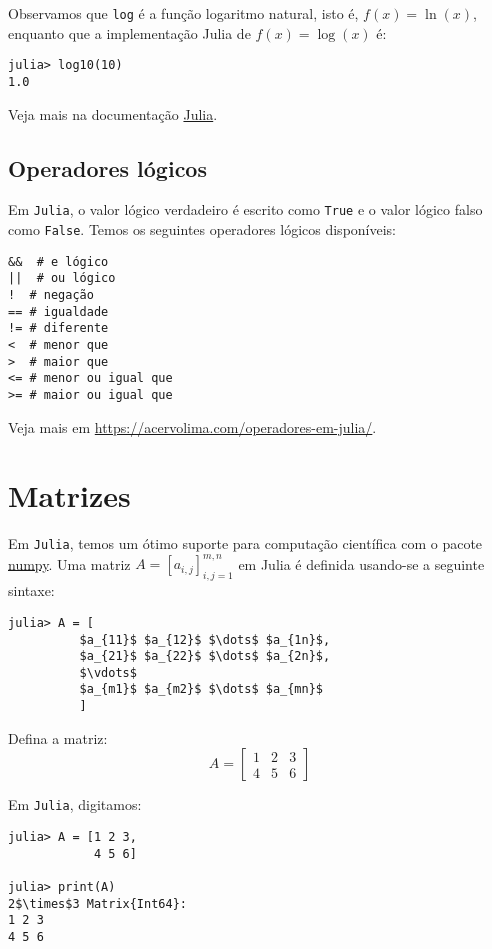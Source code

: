 Observamos que \verb+log+ é a função logaritmo natural, isto é, $f(x) = \ln(x)$, enquanto que a implementação Julia de $f(x) = \log(x)$ é:

\begin{lstlisting}
julia> log10(10)
1.0
\end{lstlisting}

Veja mais na documentação \href{https://julia-doc-pt-br.readthedocs.io/en/latest/manual/mathematical-operations.html}{Julia}.

\subsection{Operadores lógicos}

Em \verb+Julia+, o valor lógico verdadeiro é escrito como \verb+True+ e o valor lógico falso como \verb+False+. Temos os seguintes operadores lógicos disponíveis:
\begin{lstlisting}
&&  # e lógico
||  # ou lógico
!  # negação
== # igualdade
!= # diferente
<  # menor que
>  # maior que
<= # menor ou igual que
>= # maior ou igual que
\end{lstlisting}

Veja mais em \url{https://acervolima.com/operadores-em-julia/}.

\section{Matrizes}

Em \verb+Julia+, temos um ótimo suporte para computação científica com o pacote \href{http://www.numpy.org/}{numpy}. Uma matriz $A = [a_{i,j}]_{i,j=1}^{m,n}$ em Julia é definida usando-se a seguinte sintaxe:
\begin{lstlisting}[mathescape=true]
julia> A = [
          $a_{11}$ $a_{12}$ $\dots$ $a_{1n}$,
          $a_{21}$ $a_{22}$ $\dots$ $a_{2n}$,
          $\vdots$
          $a_{m1}$ $a_{m2}$ $\dots$ $a_{mn}$
          ]
\end{lstlisting}

\begin{ex}
  Defina a matriz:
  \begin{equation}
    A = \left[
      \begin{array}{ccc}
        1 & 2 & 3\\
        4 & 5 & 6
      \end{array}
\right]
  \end{equation}
\end{ex}
\begin{sol}
  Em \verb+Julia+, digitamos:
\begin{lstlisting}[mathescape=true]
julia> A = [1 2 3,
            4 5 6]

julia> print(A)
2$\times$3 Matrix{Int64}:
1 2 3
4 5 6
\end{lstlisting}
\end{sol}

